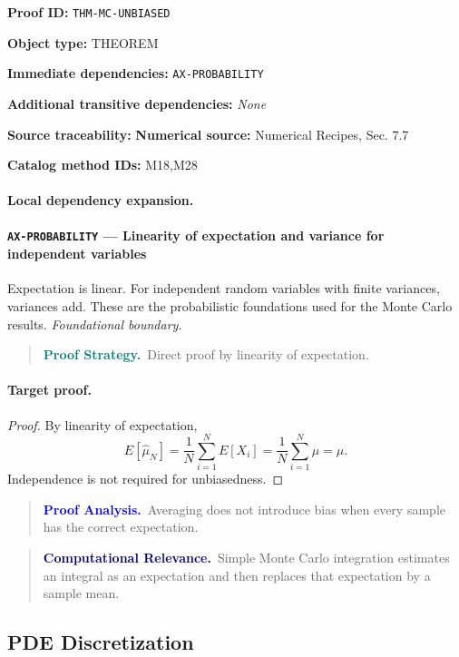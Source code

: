 \documentclass[10pt]{article}
\newcommand{\pidraw}[1]{\begingroup\urlstyle{tt}\nolinkurl{#1}\endgroup}
\theoremstyle{definition}
\theoremstyle{remark}
\newenvironment{proofstrategy}
{\begin{quote}\small\noindent\textbf{\textcolor{teal}{Proof Strategy.}}\ }
{\end{quote}}
\newenvironment{proofanalysis}
{\begin{quote}\small\noindent\textbf{\textcolor{blue}{Proof Analysis.}}\ }
{\end{quote}}
\newenvironment{computationalrelevance}
{\begin{quote}\small\noindent\textbf{\textcolor{navy}{Computational Relevance.}}\ }
{\end{quote}}
\newcommand{\meta}[2]{\noindent\textbf{#1:} #2\par}
\begin{document}
\meta{Proof ID}{\pidraw{THM-MC-UNBIASED}}
\meta{Object type}{THEOREM}
\meta{Immediate dependencies}{\pidraw{AX-PROBABILITY}}
\meta{Additional transitive dependencies}{\emph{None}}
\meta{Source traceability}{\textbf{Numerical source:} Numerical Recipes, Sec. 7.7}
\meta{Catalog method IDs}{M18,M28}

\paragraph{Local dependency expansion.}

\paragraph{\pidraw{AX-PROBABILITY} --- Linearity of expectation and variance for independent variables}
Expectation is linear. For independent random variables with finite variances, variances add. These are the probabilistic foundations used for the Monte Carlo results.
\textit{Foundational boundary.}

\begin{proofstrategy}Direct proof by linearity of expectation.\end{proofstrategy}

\paragraph{Target proof.}

\begin{proof}

By linearity of expectation,
\[
E[\widehat\mu_N]
=
\frac1N\sum_{i=1}^N E[X_i]
=
\frac1N\sum_{i=1}^N\mu
=
\mu.
\]
Independence is not required for unbiasedness.

\end{proof}

\begin{proofanalysis}Averaging does not introduce bias when every sample has the correct expectation.\end{proofanalysis}

\begin{computationalrelevance}Simple Monte Carlo integration estimates an integral as an expectation and then replaces that expectation by a sample mean.\end{computationalrelevance}

\subsection{PDE Discretization}
\end{document}
